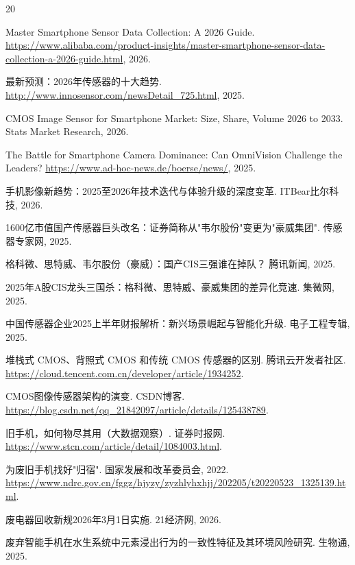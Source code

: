 \documentclass[12pt, a4paper]{ctexart}
\begin{document}
\begin{thebibliography}{20}

    Master Smartphone Sensor Data Collection: A 2026 Guide.
    \url{https://www.alibaba.com/product-insights/master-smartphone-sensor-data-collection-a-2026-guide.html}, 2026.

    最新预测：2026年传感器的十大趋势.
    \url{http://www.innosensor.com/newsDetail_725.html}, 2025.

    CMOS Image Sensor for Smartphone Market: Size, Share, Volume 2026 to 2033.
    Stats Market Research, 2026.

    The Battle for Smartphone Camera Dominance: Can OmniVision Challenge the Leaders?
    \url{https://www.ad-hoc-news.de/boerse/news/}, 2025.

    手机影像新趋势：2025至2026年技术迭代与体验升级的深度变革.
    ITBear比尔科技, 2026.

    1600亿市值国产传感器巨头改名：证券简称从"韦尔股份"变更为"豪威集团".
    传感器专家网, 2025.

    格科微、思特威、韦尔股份（豪威）：国产CIS三强谁在掉队？
    腾讯新闻, 2025.

    2025年A股CIS龙头三国杀：格科微、思特威、豪威集团的差异化竞速.
    集微网, 2025.

    中国传感器企业2025上半年财报解析：新兴场景崛起与智能化升级.
    电子工程专辑, 2025.

    堆栈式 CMOS、背照式 CMOS 和传统 CMOS 传感器的区别.
    腾讯云开发者社区.
    \url{https://cloud.tencent.com.cn/developer/article/1934252}.

    CMOS图像传感器架构的演变.
    CSDN博客.
    \url{https://blog.csdn.net/qq_21842097/article/details/125438789}.

    旧手机，如何物尽其用（大数据观察）.
    证券时报网.
    \url{https://www.stcn.com/article/detail/1084003.html}.

    为废旧手机找好"归宿".
    国家发展和改革委员会, 2022.
    \url{https://www.ndrc.gov.cn/fggz/hjyzy/zyzhlyhxhjj/202205/t20220523_1325139.html}.

    废电器回收新规2026年3月1日实施.
    21经济网, 2026.

    废弃智能手机在水生系统中元素浸出行为的一致性特征及其环境风险研究.
    生物通, 2025.


\end{thebibliography}
\end{document}
